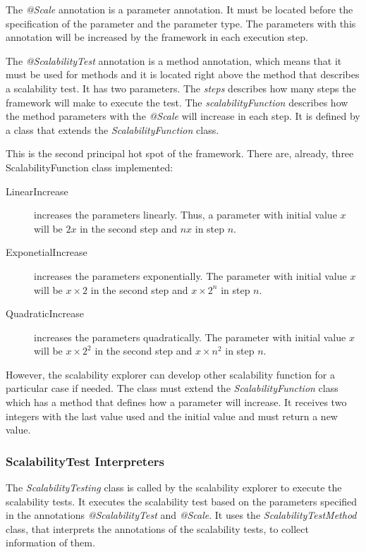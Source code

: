 The \emph{@Scale} annotation is a parameter annotation. It must be located before the specification of the parameter and the parameter type. The parameters with this annotation will be increased by the framework in each execution step.

The \emph{@ScalabilityTest} annotation is a method annotation, which means that it must be used for methods and it is located right above the method that describes a scalability test. It has two parameters. The \emph{steps} describes how many steps the framework will make to execute the test. The \emph{scalabilityFunction} describes how the method parameters with the \emph{@Scale} will increase in each step. It is defined by a class that extends the \emph{ScalabilityFunction} class.

This is the second principal hot spot of the framework. There are, already, three ScalabilityFunction class implemented:
\begin{description}
\item[LinearIncrease] increases the parameters linearly. Thus, a parameter with initial value $x$ will be $2x$ in the second step and $nx$ in step $n$.
\item[ExponetialIncrease] increases the parameters exponentially. The parameter with initial value $x$ will be $x \times 2$ in the second step and $x \times 2^n$ in step $n$.
\item[QuadraticIncrease] increases the parameters quadratically. The parameter with initial value $x$ will be $x \times 2^2$ in the second step and $x \times n^2$ in step $n$.
\end{description}

However, the scalability explorer can develop other scalability function for a particular case if needed. The class must extend the \emph{ScalabilityFunction} class which has a method that defines how a parameter will increase. It receives two integers with the last value used and the initial value and must return a new value.

\subsubsection{ScalabilityTest Interpreters}
The \emph{ScalabilityTesting} class is called by the scalability explorer to execute the scalability tests. It executes the scalability test based on the parameters specified in the annotations \emph{@ScalabilityTest} and \emph{@Scale}. It uses the \emph{ScalabilityTestMethod} class, that interprets the annotations of the scalability tests, to collect information of them.


